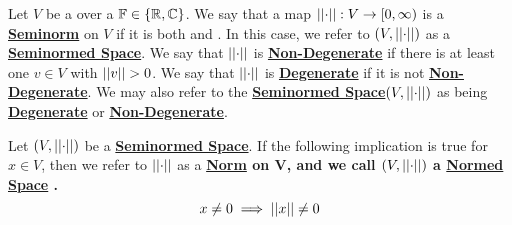 \newcommand{\Seminorm}[0]{\textbf{\hyperref[def:seminorm]{Seminorm}}\xspace}
\newcommand{\Seminorms}[0]{\textbf{\hyperref[def:seminorm]{Seminorms}}\xspace}
\newcommand{\NonDegenerate}[0]{\textbf{\hyperref[def:seminorm]{Non-Degenerate}}\xspace}
\newcommand{\Degenerate}[0]{\textbf{\hyperref[def:seminorm]{Degenerate}}\xspace}
\newcommand{\SeminormedSpace}[0]{\textbf{\hyperref[def:seminorm]{Seminormed Space}}\xspace}
\newcommand{\SeminormedSpaces}[0]{\textbf{\hyperref[def:seminorm]{Seminormed Spaces}}\xspace}
\begin{df}[Seminorm]
\label{def:seminorm}
    Let 
	$V$ be a 
	\VectorSpace
	over a 
	\Field 
	$\mathbb{F} \in \{ \mathbb{R}, \mathbb{C}\}$.  
    We say that a map 
	$\left|\left| \cdot \right|\right|:V \to [0,\infty)$ 
	is a 
	\Seminorm on 
	$V$ 
	if it is both \Subadditive and \AbsScalarHomogeneous. 
	In this case, we refer to $(V, \left|\left| \cdot \right|\right|)$ as a \SeminormedSpace. 
	We say that $\left|\left| \cdot \right|\right|$ is \NonDegenerate if there is at least one $v \in V$ with $\norm{v}>0$. 
	We say that $\left|\left| \cdot \right|\right|$ is \Degenerate if it is not \NonDegenerate.  
	We may also refer to the \SeminormedSpace $(V, \left|\left| \cdot \right|\right|)$ as being
	\Degenerate
	or
	\NonDegenerate. 
\end{df} 





\label{def:norm}
\newcommand{\Norm}[0]{
    \bf \hyperref[def:norm]{Norm} \rm
}
\label{def:normedspace}
\newcommand{\NormedSpace}[0]{
    \bf \hyperref[def:normedspace]{Normed Space} \rm
}\newcommand{\NormedSpaces}[0]{
    \bf \hyperref[def:normedspace]{Normed Spaces} \rm
}
\begin{df}[Norm]
    Let $(V,\left|\left| \cdot \right|\right|)$ be a \SeminormedSpace.
    If the following implication is true for $x \in V$, then we refer to $\left|\left| \cdot \right|\right|$ as a \Norm on V, and we call $(V, \left|\left| \cdot \right|\right|)$ a \NormedSpace.
    \begin{equation}
    x \neq 0 \implies \left|\left| x \right|\right| \neq 0
    \end{equation}
\end{df}
